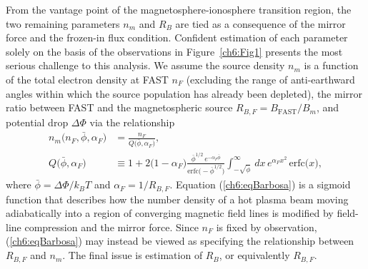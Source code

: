   From the vantage point of the magnetosphere-ionosphere transition
  region, the two remaining parameters $n_m$ and $R_B$ are tied as a
  consequence of the mirror force and the frozen-in flux
  condition. Confident estimation of each parameter solely on the
  basis of the observations in Figure~\ref{ch6:Fig1} presents the most
  serious challenge to this analysis. We assume the source density
  $n_m$ is a function of the total electron density at FAST $n_F$
  (excluding the range of anti-earthward angles within which the
  source population has already been depleted), the mirror ratio
  between FAST and the magnetospheric source $R_{B,F} =
  B_\textrm{FAST} / B_m$, and potential drop $\Delta \Phi$ via the
  relationship \citep{Ratner1976,Barbosa1977}
  \begin{subequations}
    \begin{align} n_m \big ( n_F, \bar{\phi}, \alpha_F \big ) &= \frac{n_F}{Q \big ( \bar{\phi}, \alpha_F \big ) }, \\
      Q \big ( \bar{\phi}, \alpha_F \big ) &\equiv 1 + 2 \big ( 1 -
      \alpha_F \big ) \frac{ \bar{\phi}^{1/2} \, e^{- \alpha_F
          \bar{\phi}} }{\textrm{erfc} \big ( - \bar{\phi}^{1/2} \big
        )} { \displaystyle \int_{-\sqrt{\bar{\phi}}}^{\infty} } \, dx
      \, e^{\alpha_F x^2} \, \textrm{erfc} \big ( x \big
      ), \label{ch6:eqBarbosa}
    \end{align}
  \end{subequations}
  where $\bar{\phi} = \Delta \Phi / k_B T $ and $\alpha_F = 1 /
  R_{B,F}$. Equation (\ref{ch6:eqBarbosa}) is a sigmoid function
  \citep[Figure 1b][]{Barbosa1977} that describes how the number
  density of a hot plasma beam moving adiabatically into a region of
  converging magnetic field lines is modified by field-line
  compression and the mirror force. Since $n_F$ is fixed by
  observation, (\ref{ch6:eqBarbosa}) may instead be viewed as specifying
  the relationship between $R_{B,F}$ and $n_m$. The final issue is
  estimation of $R_B$, or equivalently $R_{B,F}$.

